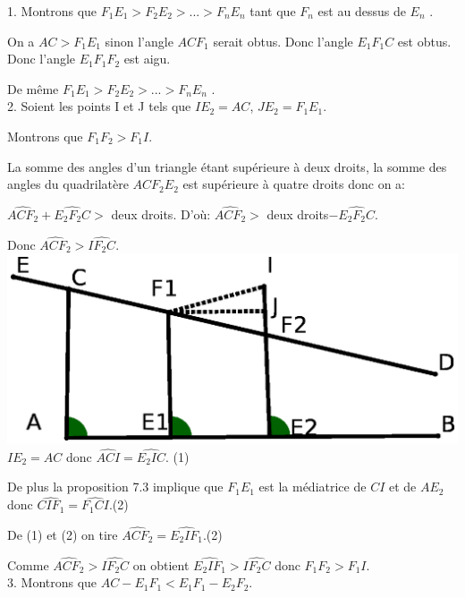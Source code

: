 \documentclass[a4paper, 12pt, twoside]{book}
\begin{document}
  1. Montrons que $F_{1}E_{1}>F_{2}E_{2} >...>F_{n}E_{n} $  tant que $F_{n}$ est au dessus de $E_{n}$ .\
  
  
  On a $AC>F_{1}E_{1}$ sinon l'angle $ACF_{1}$ serait obtus. Donc l'angle $E_{1}F_{1}C $ est obtus. Donc l'angle $E_{1}F_{1}F_{2} $ est aigu. \ 
  
 
  
  De même $F_{1}E_{1}>F_{2}E_{2} >...>F_{n}E_{n} $ .\\
  
 
 
 2. Soient les points I et J tels que 
 $IE_{2}=AC$,  $JE_{2}=F_{1}E_{1}$. \
 
 
 Montrons que $F_{1}F_{2}>F_{1}I$.\
 
 
 La somme des angles d'un triangle étant supérieure à deux droits, la somme des angles du quadrilatère $ACF_{2}E_{2}$ est supérieure à quatre droits donc on a:\
 
$\hat{ACF_{2}}+\hat{E_{2}F_{2}C}>$ deux droits. D'où:  $\hat{ACF_{2}}>$ deux droits$-\hat{E_{2}F_{2}C}$.\

Donc  $\hat{ACF_{2}}>\hat{IF_{2}C}$.\\

 \includegraphics[scale=0.6]{figures/sacc20.eps} \\
 
$IE_{2}=AC$ donc  $\hat{ACI}=\hat{E_{2}IC}$. (1)\

De plus la proposition 7.3 implique que $F_{1}E_{1}$ est la médiatrice de $CI$ et de $AE_{2}$ donc $\hat{CIF_{1}}=\hat{F_{1}CI}$.(2)\

De (1) et (2) on tire $\hat{ACF_{2}}=\hat{E_{2}IF_{1}}$.(2)\


 Comme  $\hat{ACF_{2}}>\hat{IF_{2}C}$ on obtient  $\hat{E_{2}IF_{1}}>\hat{IF_{2}C}$ donc $F_{1}F_{2}>F_{1}I$.\\
 
 
 
 3. Montrons que $AC-E_{1}F_{1}<E_{1}F_{1}-E_{2}F_{2}$.\
 
\end{document}

